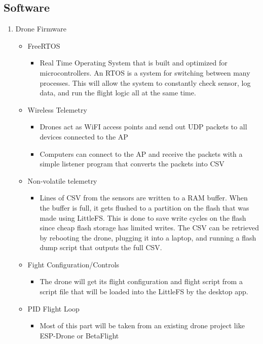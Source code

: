 \documentclass[12pt, titlepage]{article}
\begin{document}
\subsection{Software}
\begin{enumerate}
	\item Drone Firmware
	\begin{itemize}
		\item FreeRTOS
		\begin{itemize}
			\item Real Time Operating System that is built and optimized for microcontrollers. An RTOS is a system for switching between many processes. This will allow the system to constantly check sensor, log data, and run the flight logic all at the same time.
		\end{itemize}
		\item Wireless Telemetry
		\begin{itemize}
			\item Drones act as WiFI access points and send out UDP packets to all devices connected to the AP
			\item Computers can connect to the AP and receive the packets with a simple listener program that converts the packets into CSV
		\end{itemize}
		\item Non-volatile telemetry
		\begin{itemize}
			\item Lines of CSV from the sensors are written to a RAM buffer. When the buffer is full, it gets flushed to a partition on the flash that was made using LittleFS. This is done to save write cycles on the flash since cheap flash storage has limited writes. The CSV can be retrieved by rebooting the drone, plugging it into a laptop, and running a flash dump script that outputs the full CSV.
		\end{itemize}
		\item Fight Configuration/Controls
		\begin{itemize}
			\item The drone will get its flight configuration and flight script from a script file that will be loaded into the LittleFS by the desktop app. 
		\end{itemize}
		\item PID Flight Loop
		\begin{itemize}
			\item Most of this part will be taken from an existing drone project like ESP-Drone or BetaFlight
		\end{itemize}

\end{itemize}
\end{enumerate}
\end{document}
